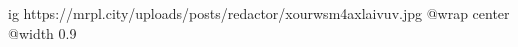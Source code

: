  
 
 
 
 

\ifcmt
  ig https://mrpl.city/uploads/posts/redactor/xourwsm4axlaivuv.jpg
  @wrap center
  @width 0.9
\fi
